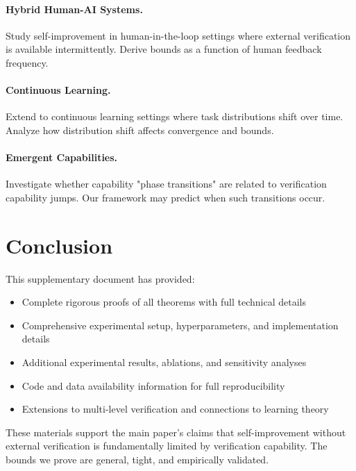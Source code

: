 \documentclass{article}
\theoremstyle{definition}
\theoremstyle{remark}
\begin{document}
\paragraph{Hybrid Human-AI Systems.}
Study self-improvement in human-in-the-loop settings where external verification is available intermittently. Derive bounds as a function of human feedback frequency.

\paragraph{Continuous Learning.}
Extend to continuous learning settings where task distributions shift over time. Analyze how distribution shift affects convergence and bounds.

\paragraph{Emergent Capabilities.}
Investigate whether capability "phase transitions" are related to verification capability jumps. Our framework may predict when such transitions occur.

\section{Conclusion}

This supplementary document has provided:
\begin{itemize}
\item Complete rigorous proofs of all theorems with full technical details
\item Comprehensive experimental setup, hyperparameters, and implementation details
\item Additional experimental results, ablations, and sensitivity analyses
\item Code and data availability information for full reproducibility
\item Extensions to multi-level verification and connections to learning theory
\end{itemize}

These materials support the main paper's claims that self-improvement without external verification is fundamentally limited by verification capability. The bounds we prove are general, tight, and empirically validated.
\end{document}
